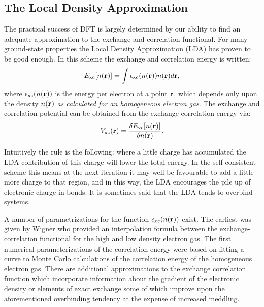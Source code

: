 \subsection{The Local Density Approximation}
\noindent
\label{sec:thelda}
The practical success of DFT is largely determined by our ability to
find an adequate approximation to the exchange and correlation functional.
For many ground-state properties the Local Density Approximation (LDA) 
has proven to be good enough. In this scheme the exchange and correlation energy
is written:
%
\begin{equation}
E_{\rm{xc}}[n({\bf r})] = \int \epsilon_{\rm{xc}}(n({\bf r}))n({\bf r})d{\bf r},
\end{equation}
%
where $\epsilon_{\rm{xc}}(n({\bf r}))$ is the energy per electron at a point ${\bf r}$,
which depends only upon the density $n({\bf r})$ \textit{as calculated for an homogeneous electron 
gas}. The exchange and correlation potential 
can be obtained from the exchange correlation energy via:
%
\begin{equation}
\label{eq:kohnshampot}
V_{\rm{xc}}({\bf r}) = \frac{\delta E_{\rm{xc}}[n({\bf r})]}{\delta n({\bf r})}.
\end{equation}
%

Intuitively the rule is the following: where a little charge has accumulated
the LDA contribution of this charge will lower the total energy. In the self-consistent
scheme this means at the next iteration it may well be favourable to add a little more
charge to that region, and in this way, the LDA encourages the pile up of electronic charge
in bonds. It is sometimes said that the LDA tends to overbind systems.

A number of parametrizations for the function $\epsilon_{xc}(n({\bf r}))$ exist.
The earliest was given by Wigner\cite{wigner34a} who provided an interpolation formula
between the exchange-correlation functional for the high and low density electron gas.
The first numerical parameterizations of the correlation energy were based
on fitting a curve to Monte Carlo calculations of the correlation energy
of the homogeneous electron gas\cite{ceperly80, vosko80, 
perdew81, perdewwang92}. There are additional approximations to the exchange 
correlation function which incorporate information about the gradient of the
electronic density or elements of exact exchange\cite{becke88, perdew96, becke93, becke93b}
some of which improve upon the aforementioned overbinding tendency at the expense of
increased meddling.

